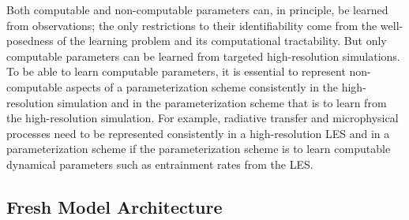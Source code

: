 \documentclass{article}
\begin{document}
Both computable and non-computable parameters can, in principle, be learned from observations; the only restrictions to their identifiability come  from the well-posedness of the learning problem and its computational tractability. But only computable parameters can be learned from targeted high-resolution simulations. To be able to learn computable parameters, it is essential to represent non-computable aspects of a parameterization scheme consistently in the high-resolution simulation and in the parameterization scheme that is to learn from the high-resolution simulation. For example, radiative transfer and microphysical processes need to be represented consistently in a high-resolution LES and in a parameterization scheme if the parameterization scheme is to learn computable dynamical parameters such as entrainment rates from the LES. 

\subsection{Fresh Model Architecture}
\end{document}
